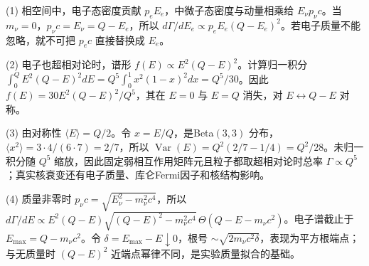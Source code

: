 (1) 相空间中，电子态密度贡献 \(p_eE_e\)，中微子态密度与动量相乘给 \(E_\nu p_\nu c\)。当 \(m_\nu=0\)，\(p_\nu c=E_\nu=Q-E_e\)，所以 \(d\Gamma/dE_e\propto p_eE_e(Q-E_e)^2\)。若电子质量不能忽略，就不可把 \(p_ec\) 直接替换成 \(E_e\)。

(2) 电子也超相对论时，谱形 \(f(E)\propto E^2(Q-E)^2\)。计算归一积分 \(\int_0^QE^2(Q-E)^2dE=Q^5\int_0^1x^2(1-x)^2dx=Q^5/30\)。因此 \(\boxed{f(E)=30E^2(Q-E)^2/Q^5}\)，其在 \(E=0\) 与 \(E=Q\) 消失，对 \(E\leftrightarrow Q-E\) 对称。

(3) 由对称性 \(\langle E\rangle=Q/2\)。令 \(x=E/Q\)，是Beta\((3,3)\) 分布，\(\langle x^2\rangle=3\cdot4/(6\cdot7)=2/7\)，所以 \(\operatorname{Var}(E)=Q^2(2/7-1/4)=Q^2/28\)。未归一积分随 \(Q^5\) 缩放，因此固定弱相互作用矩阵元且粒子都取超相对论时总率 \(\Gamma\propto Q^5\)；真实核衰变还有电子质量、库仑Fermi因子和核结构影响。

(4) 质量非零时 \(p_\nu c=\sqrt{E_\nu^2-m_\nu^2c^4}\)，所以 \(d\Gamma/dE\propto E^2(Q-E)\sqrt{(Q-E)^2-m_\nu^2c^4}\,\Theta(Q-E-m_\nu c^2)\)。电子谱截止于 \(\boxed{E_{\max}=Q-m_\nu c^2}\)。令 \(\delta=E_{\max}-E\downarrow0\)，根号 \(\sim\sqrt{2m_\nu c^2\delta}\)，表现为平方根端点；与无质量时 \((Q-E)^2\) 近端点幂律不同，是实验质量拟合的基础。
